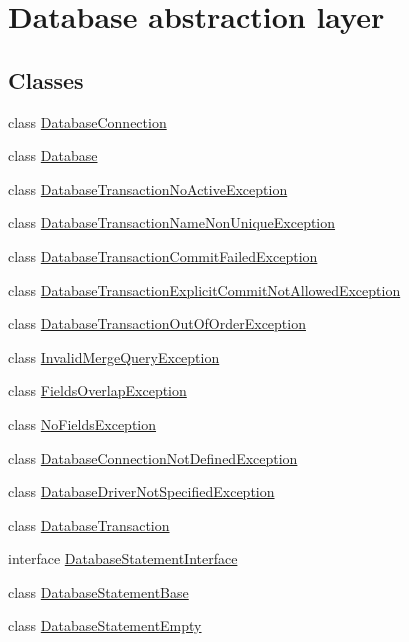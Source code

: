 \hypertarget{group__database}{
\section{Database abstraction layer}
\label{group__database}
}
\subsection*{Classes}
\begin{DoxyCompactItemize}
\item 
class \hyperlink{classDatabaseConnection}{DatabaseConnection}
\item 
class \hyperlink{classDatabase}{Database}
\item 
class \hyperlink{classDatabaseTransactionNoActiveException}{DatabaseTransactionNoActiveException}
\item 
class \hyperlink{classDatabaseTransactionNameNonUniqueException}{DatabaseTransactionNameNonUniqueException}
\item 
class \hyperlink{classDatabaseTransactionCommitFailedException}{DatabaseTransactionCommitFailedException}
\item 
class \hyperlink{classDatabaseTransactionExplicitCommitNotAllowedException}{DatabaseTransactionExplicitCommitNotAllowedException}
\item 
class \hyperlink{classDatabaseTransactionOutOfOrderException}{DatabaseTransactionOutOfOrderException}
\item 
class \hyperlink{classInvalidMergeQueryException}{InvalidMergeQueryException}
\item 
class \hyperlink{classFieldsOverlapException}{FieldsOverlapException}
\item 
class \hyperlink{classNoFieldsException}{NoFieldsException}
\item 
class \hyperlink{classDatabaseConnectionNotDefinedException}{DatabaseConnectionNotDefinedException}
\item 
class \hyperlink{classDatabaseDriverNotSpecifiedException}{DatabaseDriverNotSpecifiedException}
\item 
class \hyperlink{classDatabaseTransaction}{DatabaseTransaction}
\item 
interface \hyperlink{interfaceDatabaseStatementInterface}{DatabaseStatementInterface}
\item 
class \hyperlink{classDatabaseStatementBase}{DatabaseStatementBase}
\item 
class \hyperlink{classDatabaseStatementEmpty}{DatabaseStatementEmpty}

\end{DoxyCompactItemize}
